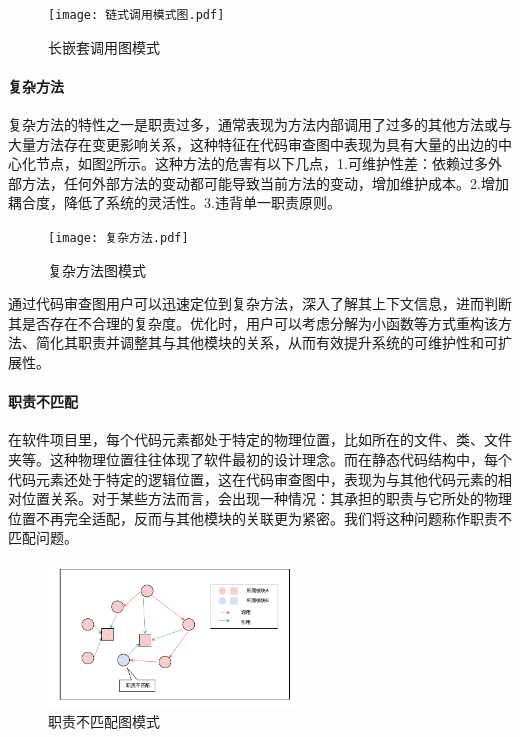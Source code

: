 \begin{figure}[h]
\centering
\texttt{[image: 链式调用模式图.pdf]}
\caption{长嵌套调用图模式}
\label{1_长嵌套调用图模式}
\end{figure}




\paragraph{复杂方法} 复杂方法的特性之一是职责过多，通常表现为方法内部调用了过多的其他方法或与大量方法存在变更影响关系，这种特征在代码审查图中表现为具有大量的出边的中心化节点，如图\ref{1_复杂方法图模式}所示。这种方法的危害有以下几点，1.可维护性差：依赖过多外部方法，任何外部方法的变动都可能导致当前方法的变动，增加维护成本。2.增加耦合度，降低了系统的灵活性。3.违背单一职责原则。

\begin{figure}[h]
\centering
\texttt{[image: 复杂方法.pdf]}
\caption{复杂方法图模式}
\label{1_复杂方法图模式}
\end{figure}



通过代码审查图用户可以迅速定位到复杂方法，深入了解其上下文信息，进而判断其是否存在不合理的复杂度。优化时，用户可以考虑分解为小函数等方式重构该方法、简化其职责并调整其与其他模块的关系，从而有效提升系统的可维护性和可扩展性。


\paragraph{职责不匹配} 在软件项目里，每个代码元素都处于特定的物理位置，比如所在的文件、类、文件夹等。这种物理位置往往体现了软件最初的设计理念。而在静态代码结构中，每个代码元素还处于特定的逻辑位置，这在代码审查图中，表现为与其他代码元素的相对位置关系。对于某些方法而言，会出现一种情况：其承担的职责与它所处的物理位置不再完全适配，反而与其他模块的关联更为紧密。我们将这种问题称作职责不匹配问题。

\begin{figure}[h]
\centering
\includegraphics[width = 0.6\textwidth]{figures/职责不匹配.pdf}
\caption{职责不匹配图模式}
\label{1_职责不匹配图模式}
\end{figure}

